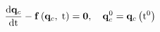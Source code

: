 
\begin{equation}\label{eq:FOM}
    \frac{\text{d} \mathbf{q}_c}{\text{d} \text{t}} - \mathbf{f} \left(\mathbf{q}_c, \; \text{t}\right) = \mathbf{0}, \quad \mathbf{q}_c^0 = \mathbf{q}_c \left(\text{t}^0\right)
\end{equation}